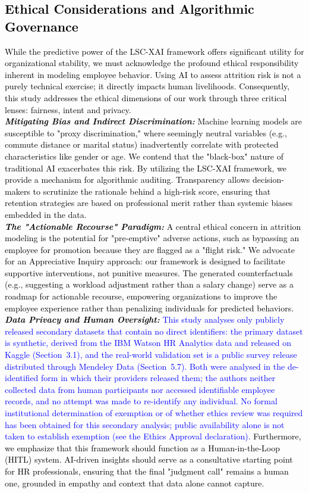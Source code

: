 \documentclass[a4paper,fleqn]{cas-sc}
\begin{document}
\subsection{\textcolor{black}{Ethical Considerations and Algorithmic Governance}}
\textcolor{black}{While the predictive power of the LSC-XAI framework offers significant utility for organizational stability, we must acknowledge the profound ethical responsibility inherent in modeling employee behavior. Using AI to assess attrition risk is not a purely technical exercise; it directly impacts human livelihoods. Consequently, this study addresses the ethical dimensions of our work through three critical lenses: fairness, intent and privacy.\\
\textit{\textbf{Mitigating Bias and Indirect Discrimination:}}
Machine learning models are susceptible to "proxy discrimination," where seemingly neutral variables (e.g., commute distance or marital status) inadvertently correlate with protected characteristics like gender or age. We contend that the "black-box" nature of traditional AI exacerbates this risk. By utilizing the LSC-XAI framework, we provide a mechanism for algorithmic auditing. Transparency allows decision-makers to scrutinize the rationale behind a high-risk score, ensuring that retention strategies are based on professional merit rather than systemic biases embedded in the data.\\
\textit{\textbf{The "Actionable Recourse" Paradigm:}}
A central ethical concern in attrition modeling is the potential for "pre-emptive" adverse actions, such as bypassing an employee for promotion because they are flagged as a "flight risk." We advocate for an Appreciative Inquiry approach: our framework is designed to facilitate supportive interventions, not punitive measures. The generated counterfactuals (e.g., suggesting a workload adjustment rather than a salary change) serve as a roadmap for actionable recourse, empowering organizations to improve the employee experience rather than penalizing individuals for predicted behaviors.\\
\textit{\textbf{Data Privacy and Human Oversight:}}
\textcolor{blue}{This study analyses only publicly released secondary datasets that contain no direct identifiers: the primary dataset is synthetic, derived from the IBM Watson HR Analytics data and released on Kaggle (Section~3.1), and the real-world validation set is a public survey release distributed through Mendeley Data (Section~5.7). Both were analysed in the de-identified form in which their providers released them; the authors neither collected data from human participants nor accessed identifiable employee records, and no attempt was made to re-identify any individual. No formal institutional determination of exemption or of whether ethics review was required has been obtained for this secondary analysis; public availability alone is not taken to establish exemption (see the Ethics Approval declaration).} Furthermore, we emphasize that this framework should function as a Human-in-the-Loop (HITL) system. AI-driven insights should serve as a consultative starting point for HR professionals, ensuring that the final "judgment call" remains a human one, grounded in empathy and context that data alone cannot capture.}\\
\end{document}
